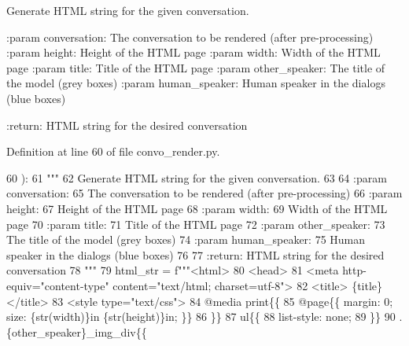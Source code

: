 \begin{DoxyVerb}Generate HTML string for the given conversation.

:param conversation:
    The conversation to be rendered (after pre-processing)
:param height:
    Height of the HTML page
:param width:
    Width of the HTML page
:param title:
    Title of the HTML page
:param other_speaker:
    The title of the model (grey boxes)
:param human_speaker:
    Human speaker in the dialogs (blue boxes)

:return: HTML string for the desired conversation
\end{DoxyVerb}
 

Definition at line 60 of file convo\+\_\+render.\+py.


\begin{DoxyCode}
60 ):
61     \textcolor{stringliteral}{"""}
62 \textcolor{stringliteral}{    Generate HTML string for the given conversation.}
63 \textcolor{stringliteral}{}
64 \textcolor{stringliteral}{    :param conversation:}
65 \textcolor{stringliteral}{        The conversation to be rendered (after pre-processing)}
66 \textcolor{stringliteral}{    :param height:}
67 \textcolor{stringliteral}{        Height of the HTML page}
68 \textcolor{stringliteral}{    :param width:}
69 \textcolor{stringliteral}{        Width of the HTML page}
70 \textcolor{stringliteral}{    :param title:}
71 \textcolor{stringliteral}{        Title of the HTML page}
72 \textcolor{stringliteral}{    :param other\_speaker:}
73 \textcolor{stringliteral}{        The title of the model (grey boxes)}
74 \textcolor{stringliteral}{    :param human\_speaker:}
75 \textcolor{stringliteral}{        Human speaker in the dialogs (blue boxes)}
76 \textcolor{stringliteral}{}
77 \textcolor{stringliteral}{    :return: HTML string for the desired conversation}
78 \textcolor{stringliteral}{    """}
79     html\_str = f\textcolor{stringliteral}{"""<html>}
80 \textcolor{stringliteral}{<head>}
81 \textcolor{stringliteral}{    <meta http-equiv="content-type" content="text/html; charset=utf-8">}
82 \textcolor{stringliteral}{    <title> \{title\} </title>}
83 \textcolor{stringliteral}{    <style type="text/css">}
84 \textcolor{stringliteral}{        @media print\{\{}
85 \textcolor{stringliteral}{            @page\{\{ margin: 0; size: \{str(width)\}in \{str(height)\}in; \}\}}
86 \textcolor{stringliteral}{        \}\}}
87 \textcolor{stringliteral}{        ul\{\{}
88 \textcolor{stringliteral}{          list-style: none;}
89 \textcolor{stringliteral}{        \}\}}
90 \textcolor{stringliteral}{        .\{other\_speaker\}\_img\_div\{\{}

\end{DoxyCode}
